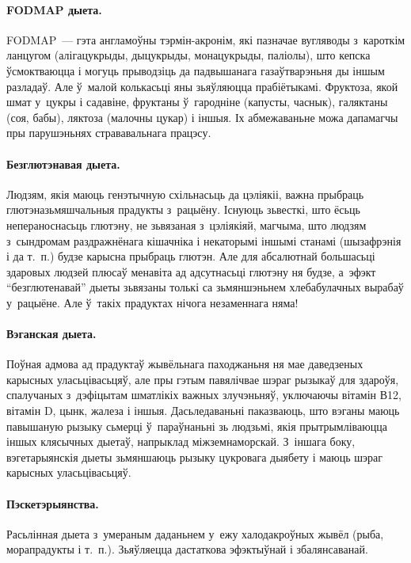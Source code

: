 \paragraph{FODMAP дыета.}
FODMAP~--- гэта англамоўны тэрмін-акронім, які пазначае вугляводы з~кароткім ланцугом (алігацукрыды, дыцукрыды, монацукрыды, паліолы), што кепска ўсмоктваюцца і могуць прыводзіць да падвышанага газаўтварэньня ды іншым разладаў. Але ў~малой колькасьці яны зьяўляюцца прабіётыкамі. Фруктоза, якой шмат у~цукры і садавіне, фруктаны ў~гародніне (капусты, часнык), галяктаны (соя, бабы), ляктоза (малочны цукар) і іншыя. Іх абмежаваньне можа дапамагчы пры парушэньнях стрававальнага працэсу.

\paragraph{Безглютэнавая дыета.}
Людзям, якія маюць генэтычную схільнасьць да цэліякіі, важна прыбраць глютэназьмяшчальныя прадукты з~рацыёну. Існуюць зьвесткі, што ёсьць непераноснасьць глютэну, не зьвязаная з~цэліякіяй, магчыма, што людзям з~сындромам раздражнёнага кішачніка і некаторымі іншымі станамі (шызафрэнія і да т.~п.) будзе карысна прыбраць глютэн. Але для абсалютнай большасьці здаровых людзей плюсаў менавіта ад адсутнасьці глютэну ня будзе, а~эфэкт ``безглютенавай'' дыеты зьвязаны толькі са зьмяншэньнем хлебабулачных вырабаў у~рацыёне. Але ў~такіх прадуктах нічога незаменнага няма!

\paragraph{Вэганская дыета.}
Поўная адмова ад прадуктаў жывёльнага паходжаньня ня мае даведзеных карысных уласьцівасьцяў, але пры гэтым павялічвае шэраг рызыкаў для здароўя, спалучаных з~дэфіцытам шматлікіх важных злучэньняў, уключаючы вітамін В12, вітамін D, цынк, жалеза і іншыя. Дасьледаваньні паказваюць, што вэганы маюць павышаную рызыку сьмерці ў~параўнаньні зь людзьмі, якія прытрымліваюцца іншых клясычных дыетаў, напрыклад міжземнаморскай. З~іншага боку, вэгетарыянскія дыеты зьмяншаюць рызыку цукровага дыябету і маюць шэраг карысных уласьцівасьцяў.


\paragraph{Пэскетэрыянства.}
Расьлінная дыета з~умераным даданьнем у~ежу халодакроўных жывёл (рыба, морапрадукты і т.~п.). Зьяўляецца дастаткова эфэктыўнай і збалянсаванай.

